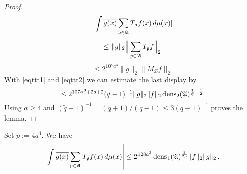 \begin{proof}
 \begin{equation}
     |\int \overline{g(x)} \sum_{{\mathfrak p} \in \mathfrak{A}} T_{{\mathfrak p}} f(x)\, d\mu(x)|
\end{equation}
 \begin{equation}
     \le \|g\|_2 \Big\| \sum_{{\mathfrak p} \in \mathfrak{A}} T_{{\mathfrak p}} f \Big\|_2
\end{equation}
 \begin{equation}
     \le 2^{107a^3}\|g\|_2 \| M_{\mathcal{B}}f \|_2
\end{equation}
With \eqref{eqttt1} and
\eqref{eqttt2} we can estimate the last display by
\begin{equation}
    \le 2^{107a^3+2a+2}(\tilde{q}-1)^{-1} \|g\|_2 \|f\|_2\operatorname{\operatorname{dens}}_2(\mathfrak{A})^{\frac 1{\tilde{q}}-\frac 12}
\end{equation}
Using $a\ge 4$ and
$(\tilde q - 1)^{-1} = (q+1)/(q-1) \le 3(q-1)^{-1}$
proves the lemma.
\end{proof}


\begin{lemma}\label{dens1-antichain}
    \leanok
Set $p:=4a^4$. We have
    \begin{equation}\label{eqttt3}
  \left|\int \overline{g(x)} \sum_{{\mathfrak p} \in \mathfrak{A}} T_{{\mathfrak p}} f(x)\, d\mu(x)\right|\le
   2^{128a^3}\operatorname{\operatorname{dens}}_1(\mathfrak{A})^{\frac 1{2p}} \|f\|_2\|g\|_2\,.
\end{equation}
\end{lemma}


